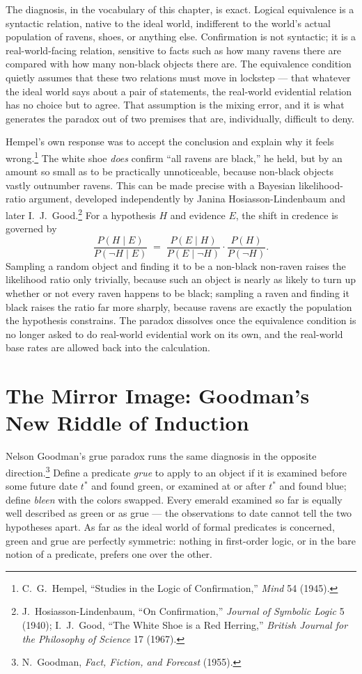 \documentclass[11pt]{book}
\begin{document}
The diagnosis, in the vocabulary of this chapter, is exact. Logical equivalence is a syntactic relation, native to the ideal world, indifferent to the world's actual population of ravens, shoes, or anything else. Confirmation is not syntactic; it is a real-world-facing relation, sensitive to facts such as how many ravens there are compared with how many non-black objects there are. The equivalence condition quietly assumes that these two relations must move in lockstep --- that whatever the ideal world says about a pair of statements, the real-world evidential relation has no choice but to agree. That assumption is the mixing error, and it is what generates the paradox out of two premises that are, individually, difficult to deny.

Hempel's own response was to accept the conclusion and explain why it feels wrong.\footnote{C.\ G.\ Hempel, ``Studies in the Logic of Confirmation,'' \emph{Mind} 54 (1945).} The white shoe \emph{does} confirm ``all ravens are black,'' he held, but by an amount so small as to be practically unnoticeable, because non-black objects vastly outnumber ravens. This can be made precise with a Bayesian likelihood-ratio argument, developed independently by Janina Hosiasson-Lindenbaum and later I.\ J.\ Good.\footnote{J.\ Hosiasson-Lindenbaum, ``On Confirmation,'' \emph{Journal of Symbolic Logic} 5 (1940); I.\ J.\ Good, ``The White Shoe is a Red Herring,'' \emph{British Journal for the Philosophy of Science} 17 (1967).} For a hypothesis $H$ and evidence $E$, the shift in credence is governed by
\[
\frac{P(H \mid E)}{P(\neg H \mid E)} \;=\; \frac{P(E \mid H)}{P(E \mid \neg H)} \cdot \frac{P(H)}{P(\neg H)}.
\]
Sampling a random object and finding it to be a non-black non-raven raises the likelihood ratio only trivially, because such an object is nearly as likely to turn up whether or not every raven happens to be black; sampling a raven and finding it black raises the ratio far more sharply, because ravens are exactly the population the hypothesis constrains. The paradox dissolves once the equivalence condition is no longer asked to do real-world evidential work on its own, and the real-world base rates are allowed back into the calculation.

\section{The Mirror Image: Goodman's New Riddle of Induction}

Nelson Goodman's grue paradox runs the same diagnosis in the opposite direction.\footnote{N.\ Goodman, \emph{Fact, Fiction, and Forecast} (1955).} Define a predicate \emph{grue} to apply to an object if it is examined before some future date $t^\ast$ and found green, or examined at or after $t^\ast$ and found blue; define \emph{bleen} with the colors swapped. Every emerald examined so far is equally well described as green or as grue --- the observations to date cannot tell the two hypotheses apart. As far as the ideal world of formal predicates is concerned, green and grue are perfectly symmetric: nothing in first-order logic, or in the bare notion of a predicate, prefers one over the other.
\end{document}
